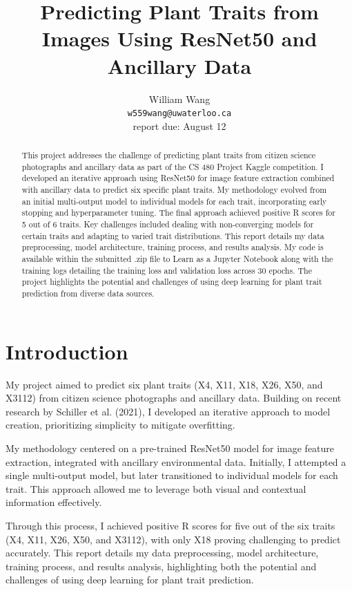 \documentclass{article}
\title{Predicting Plant Traits from Images Using ResNet50 and Ancillary Data}
\author{
	William Wang \\
	\texttt{w559wang@uwaterloo.ca} \\
	{\color{red} report due: August 12}
}
\begin{document}
\maketitle

\begin{abstract} 
This project addresses the challenge of predicting plant traits from citizen science photographs and ancillary data as part of the CS 480 Project Kaggle competition. I developed an iterative approach using ResNet50 for image feature extraction combined with ancillary data to predict six specific plant traits. My methodology evolved from an initial multi-output model to individual models for each trait, incorporating early stopping and hyperparameter tuning. The final approach achieved positive R scores for 5 out of 6 traits. Key challenges included dealing with non-converging models for certain traits and adapting to varied trait distributions. This report details my data preprocessing, model architecture, training process, and results analysis. My code is available within the submitted .zip file to Learn as a Jupyter Notebook along with the training logs detailing the training loss and validation loss across 30 epochs. The project highlights the potential and challenges of using deep learning for plant trait prediction from diverse data sources.
\end{abstract} 

\section{Introduction}
My project aimed to predict six plant traits (X4, X11, X18, X26, X50, and X3112) from citizen science photographs and ancillary data. Building on recent research by Schiller et al. (2021), I developed an iterative approach to model creation, prioritizing simplicity to mitigate overfitting.

My methodology centered on a pre-trained ResNet50 model for image feature extraction, integrated with ancillary environmental data. Initially, I attempted a single multi-output model, but later transitioned to individual models for each trait. This approach allowed me to leverage both visual and contextual information effectively.

Through this process, I achieved positive R scores for five out of the six traits (X4, X11, X26, X50, and X3112), with only X18 proving challenging to predict accurately. This report details my data preprocessing, model architecture, training process, and results analysis, highlighting both the potential and challenges of using deep learning for plant trait prediction.
\end{document}
